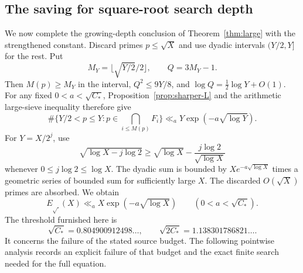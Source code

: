 \subsection{The saving for square-root search depth}
We now complete the growing-depth conclusion of
Theorem~\ref{thm:large} with the strengthened constant.
Discard primes $p\le\sqrt X$ and use dyadic intervals $(Y/2,Y]$
for the rest. Put
\[
 M_Y=\lfloor\sqrt{Y/2}/2\rfloor,\qquad Q=3M_Y-1.
\]
Then $M(p)\ge M_Y$ in the interval,
$Q^2\le9Y/8$, and $\log Q=\frac12\log Y+O(1)$.
For any fixed $0<a<\sqrt{C_*}$,
Proposition~\ref{prop:sharper-L} and the arithmetic
large-sieve inequality therefore give
\[
 \#\{Y/2<p\le Y:p\in\bigcap_{i\le M(p)}F_i\}
       \ll_a Y\exp(-a\sqrt{\log Y}).
\]
For $Y=X/2^j$, use
\[
 \sqrt{\log X-j\log2}
 \ge\sqrt{\log X}-\frac{j\log2}{\sqrt{\log X}}
\]
whenever $0\le j\log2\le\log X$.
The dyadic sum is bounded by $Xe^{-a\sqrt{\log X}}$
times a geometric series of bounded sum for sufficiently large
$X$. The discarded $O(\sqrt X)$ primes are absorbed. We obtain
\begin{equation}\label{eq:sharper-sqrt}
 E_{\sqrt{\ }}(X)\ll_a X\exp(-a\sqrt{\log X})
 \qquad(0<a<\sqrt{C_*}).
\end{equation}
The threshold furnished here is
\[
 \sqrt{C_*}=0.804900912498\ldots,\qquad
 \sqrt{2C_*}=1.138301786821\ldots .
\]
It concerns the failure of the stated source budget. The following
pointwise analysis records an explicit failure of that budget
and the exact finite search needed for the full equation.
